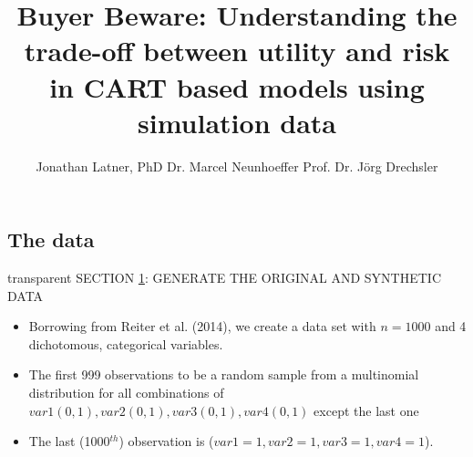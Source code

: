 \documentclass[t,8pt,utfx8]{beamer}
\title{Buyer Beware: Understanding the trade-off between utility and risk in CART based models using simulation data}
\author{Jonathan Latner, PhD \newline Dr. Marcel Neunhoeffer \newline Prof. Dr. Jörg Drechsler}
\begin{document}
\frame[plain]{\titlepage}

\begin{spacing}{1.25}

\section{The data}\label{sec:data}
\begin{frame}[c,plain]
\vskip-4mm
\begin{beamercolorbox}[wd=\boxwidth,ht=22.11mm]{transparent}%
    \vfill%
    \leftinsert%
    \MakeUppercase{Section \ref{sec:data}: Generate the original and synthetic data
} %
\end{beamercolorbox}
\vskip-3mm
\begin{itemize}
    \item Borrowing from Reiter et al. (2014), we create a data set with $n=1000$ and 4 dichotomous, categorical variables. 
    \item The first 999 observations to be a random sample from a multinomial distribution for all combinations of $var1(0,1), var2(0,1), var3(0,1), var4(0,1)$ except the last one
    \item The last (1000$^{th}$) observation is ($var1=1,var2=1,var3=1,var4=1$). 
\end{itemize}

\end{frame}


\end{spacing}
\end{document}
